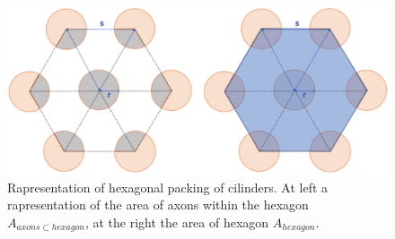   \begin{figure}[h]
   \centering
   \begin{minipage}[c]{.6\textwidth}
      \includegraphics[width=\textwidth]{images/geometry_axons.png}
   \end{minipage}\hfill
   \begin{minipage}[c]{.35\textwidth}
      \caption{Rapresentation of hexagonal packing of cilinders. At left a rapresentation of the area of axons within the hexagon $A_{axons \subset hexagon}$, at the right the area of hexagon $A_{hexagon}$. \cite{berger2020} }
      \label{fig:hexagonal_packing}
   \end{minipage}
 \end{figure}

